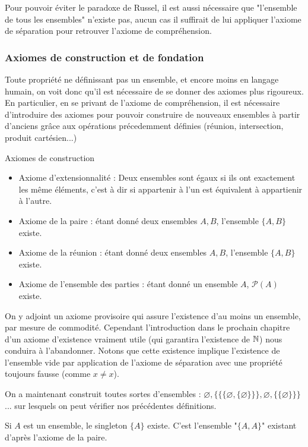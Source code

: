 Pour pouvoir éviter le paradoxe de Russel, il est aussi nécessaire que "l'ensemble de tous les ensembles" n'existe pas, aucun cas il suffirait de lui appliquer l'axiome de séparation pour retrouver l'axiome de compréhension.

\subsubsection{Axiomes de construction et de fondation}

Toute propriété ne définissant pas un ensemble, et encore moins en langage humain, on voit donc qu'il est nécessaire de se donner des axiomes plus rigoureux. En particulier, en se privant de l'axiome de compréhension, il est nécessaire d'introduire des axiomes pour pouvoir construire de nouveaux ensembles à partir d'anciens grâce aux opérations précedemment définies (réunion, intersection, produit cartésien...)

\begin{boite}{Axiomes de construction}
	\begin{itemize}
		\item Axiome d'extensionnalité : Deux ensembles sont égaux si ils ont exactement les même éléments, c'est à dir si appartenir à l'un est équivalent à appartienir à l'autre.
		\item Axiome de la paire : étant donné deux ensembles $A, B$, l'ensemble $\{A, B\}$ existe.
		\item Axiome de la réunion : étant donné deux ensembles $A, B$, l'ensemble $\{A, B\}$ existe.
		\item Axiome de l'ensemble des parties : étant donné un ensemble $A$, $\mathcal{P}(A)$ existe.
	\end{itemize}
\end{boite}

On y adjoint un axiome provisoire qui assure l'existence d'au moins un ensemble, par mesure de commodité. Cependant l'introduction dans le prochain chapitre d'un axiome d'existence vraiment utile (qui garantira l'existence de $\mathbb{N}$) nous conduira à l'abandonner. Notons que cette existence implique l'existence de l'ensemble vide par application de l'axiome de séparation avec une propriété toujours fausse (comme $x\neq x$).

On a maintenant construit toutes sortes d'ensembles : $\varnothing, \{\{\{\varnothing, \{\varnothing\}\}\}, \varnothing, \{\{\varnothing\}\}\}$... sur lesquels on peut vérifier nos précédentes définitions.

\begin{prop}
	Si $A$ est un ensemble, le singleton $\{A\}$ existe.
	\tcblower
	C'est l'ensemble "$\{A, A\}$" existant d'après l'axiome de la paire. 
\end{prop}


